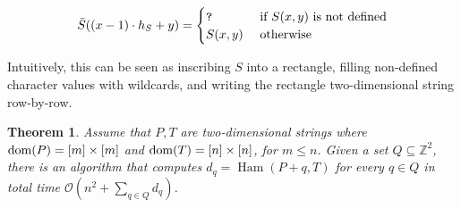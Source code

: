 \documentclass[11pt, letterpaper]{article}
\theoremstyle{plain}
\newtheorem{theorem}{Theorem}
\theoremstyle{definition}
\theoremstyle{remark}
\newcommand{\Z}{\mathbb{Z}}
\renewcommand{\O}{\mathcal{O}}
\DeclareMathOperator*{\Ham}{Ham}
\begin{document}
$$
\bar{S}((x-1) \cdot h_S + y) =
\begin{cases}
\texttt{?} & \text{ if } S(x,y) \text{ is not defined}\\
S(x,y) & \text{ otherwise}
\end{cases}
$$

Intuitively, this can be seen as inscribing $S$ into a rectangle, filling non-defined character values with wildcards, and writing the rectangle two-dimensional string row-by-row. 

\begin{theorem}\label{kangaroos}
Assume that $P, T$ are two-dimensional strings where $\operatorname*{dom}(P) = [m] \times [m]$ and $\operatorname*{dom}(T) = [n] \times [n]$, for $m \le n$. Given a set $Q \subseteq \Z^2$, there is an algorithm that computes $d_q = \Ham(P + q, T) $ for every $q \in Q$ in total time $\O(n^2 + \sum_{q \in Q} d_q)$.
\end{theorem}
\end{document}
